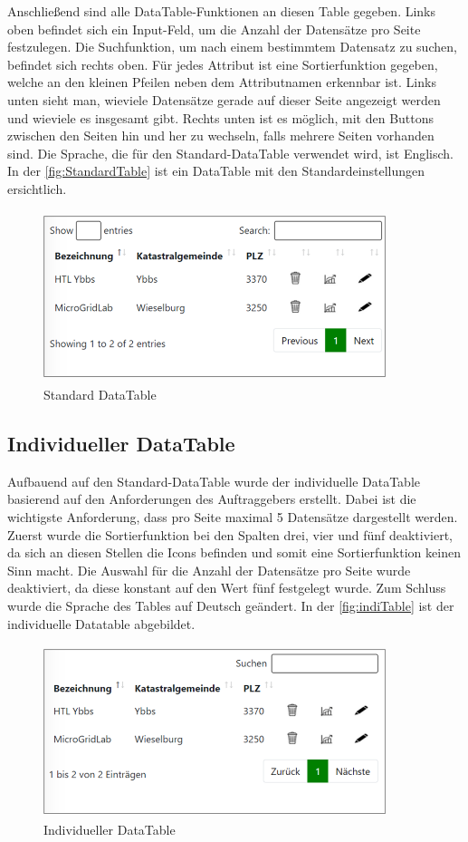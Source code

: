Anschließend sind alle DataTable-Funktionen an diesen Table gegeben.
Links oben befindet sich ein Input-Feld, um die Anzahl der Datensätze pro Seite festzulegen. Die Suchfunktion, um nach einem bestimmtem Datensatz zu suchen, befindet sich rechts oben.
Für jedes Attribut ist eine Sortierfunktion gegeben, welche an den kleinen Pfeilen neben dem Attributnamen erkennbar ist. Links unten sieht man, wieviele Datensätze gerade auf dieser Seite angezeigt werden und wieviele es insgesamt gibt. Rechts unten ist es möglich, mit den Buttons zwischen den Seiten hin und her zu wechseln, falls mehrere Seiten vorhanden sind.
Die Sprache, die für den Standard-DataTable verwendet wird, ist Englisch.
In der \autoref{fig:StandardTable} ist ein DataTable mit den Standardeinstellungen ersichtlich.
\newline
\begin{figure}[h]
	\centering
	\includegraphics[height=5cm,width=10cm]{images/DataTableStandard}
	\caption{Standard DataTable}
	\label{fig:StandardTable}
\end{figure}


\subsection{Individueller DataTable}
Aufbauend auf den Standard-DataTable wurde der individuelle DataTable basierend auf den Anforderungen des Auftraggebers erstellt. Dabei ist die wichtigste Anforderung, dass pro Seite maximal 5 Datensätze dargestellt werden.
Zuerst wurde die Sortierfunktion bei den Spalten drei, vier und fünf deaktiviert, da sich an diesen Stellen die Icons befinden und somit eine Sortierfunktion keinen Sinn macht. Die Auswahl für die Anzahl der Datensätze pro Seite wurde deaktiviert, da diese konstant auf den Wert fünf festgelegt wurde. Zum Schluss wurde die Sprache des Tables auf Deutsch geändert.
In der \autoref{fig:indiTable} ist der individuelle Datatable abgebildet.
\begin{figure}[h]
	\centering
	\includegraphics[height=5cm,width=10cm]{images/DataTableIndividuell}
	\caption{Individueller DataTable}
	\label{fig:indiTable}
\end{figure}




